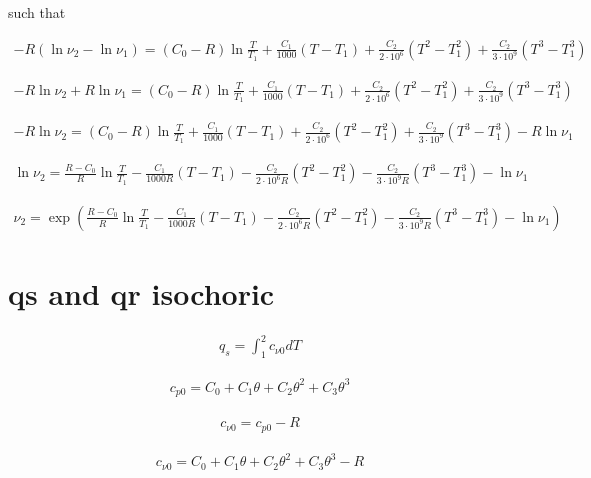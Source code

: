 \documentclass{article}
\begin{document}
	such that

	\begin{align*}
		-R(\ln\nu_2 - \ln\nu_1) = (C_0 - R)\ln\frac{T}{T_1} + \frac{C_1}{1000}(T - T_1) + \frac{C_2}{2\cdot10^6}(T^2 - T_1^2) + \frac{C_2}{3\cdot10^9}(T^3 - T_1^3)
	\end{align*}

	\begin{align*}
		-R\ln\nu_2 + R\ln\nu_1 = (C_0 - R)\ln\frac{T}{T_1} + \frac{C_1}{1000}(T - T_1) + \frac{C_2}{2\cdot10^6}(T^2 - T_1^2) + \frac{C_2}{3\cdot10^9}(T^3 - T_1^3)
	\end{align*}

	\begin{align*}
		-R\ln\nu_2 = (C_0 - R)\ln\frac{T}{T_1} + \frac{C_1}{1000}(T - T_1) + \frac{C_2}{2\cdot10^6}(T^2 - T_1^2) + \frac{C_2}{3\cdot10^9}(T^3 - T_1^3) - R\ln\nu_1
	\end{align*}

	\begin{align*}
		\ln\nu_2 = \frac{R - C_0}{R}\ln\frac{T}{T_1} - \frac{C_1}{1000R}(T - T_1) - \frac{C_2}{2\cdot10^6R}(T^2 - T_1^2) - \frac{C_2}{3\cdot10^9R}(T^3 - T_1^3) - \ln\nu_1
	\end{align*}

	\begin{align*}
		\nu_2 = \exp\left(\frac{R - C_0}{R}\ln\frac{T}{T_1} - \frac{C_1}{1000R}(T - T_1) - \frac{C_2}{2\cdot10^6R}(T^2 - T_1^2) - \frac{C_2}{3\cdot10^9R}(T^3 - T_1^3) - \ln\nu_1\right)
	\end{align*}

	\section{qs and qr isochoric}

	\begin{align*}
		q_s = \int_1^2 c_{\nu0}dT
	\end{align*}

	\begin{align*}
		c_{p0} = C_0 + C_1\theta + C_2\theta^2 + C_3\theta^3
	\end{align*}

	\begin{align*}
		c_{\nu0} = c_{p0} - R
	\end{align*}

	\begin{align*}
		c_{\nu0} = C_0 + C_1\theta + C_2\theta^2 + C_3\theta^3 - R
	\end{align*}
\end{document}
